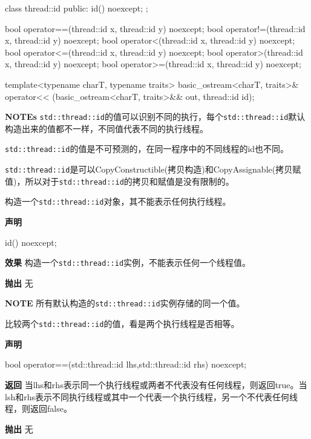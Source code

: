 \begin{cpp}
class thread::id
{
public:
  id() noexcept;
};

bool operator==(thread::id x, thread::id y) noexcept;
bool operator!=(thread::id x, thread::id y) noexcept;
bool operator<(thread::id x, thread::id y) noexcept;
bool operator<=(thread::id x, thread::id y) noexcept;
bool operator>(thread::id x, thread::id y) noexcept;
bool operator>=(thread::id x, thread::id y) noexcept;

template<typename charT, typename traits>
basic_ostream<charT, traits>&
operator<< (basic_ostream<charT, traits>&& out, thread::id id);
\end{cpp}

\textbf{NOTEs}
\texttt{std::thread::id}的值可以识别不同的执行，每个\texttt{std::thread::id}默认构造出来的值都不一样，不同值代表不同的执行线程。

\texttt{std::thread::id}的值是不可预测的，在同一程序中的不同线程的id也不同。

\texttt{std::thread::id}是可以CopyConstructible(拷贝构造)和CopyAssignable(拷贝赋值)，所以对于\texttt{std::thread::id}的拷贝和赋值是没有限制的。


构造一个\texttt{std::thread::id}对象，其不能表示任何执行线程。

\textbf{声明}

\begin{cpp}
id() noexcept;
\end{cpp}

\textbf{效果}
构造一个\texttt{std::thread::id}实例，不能表示任何一个线程值。

\textbf{抛出}
无

\textbf{NOTE} 所有默认构造的\texttt{std::thread::id}实例存储的同一个值。


比较两个\texttt{std::thread::id}的值，看是两个执行线程是否相等。

\textbf{声明}

\begin{cpp}
bool operator==(std::thread::id lhs,std::thread::id rhs) noexcept;
\end{cpp}

\textbf{返回}
当lhs和rhs表示同一个执行线程或两者不代表没有任何线程，则返回true。当lsh和rhs表示不同执行线程或其中一个代表一个执行线程，另一个不代表任何线程，则返回false。

\textbf{抛出}
无

